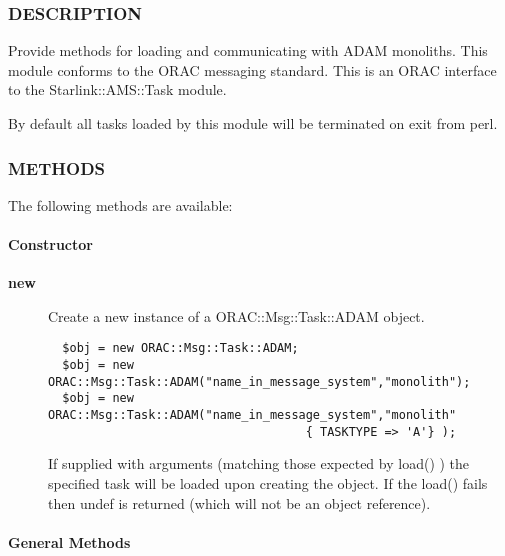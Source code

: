 \begin{description}
\begin{description}
\subsubsection*{DESCRIPTION\label{ORAC::Msg::Task::ADAM_DESCRIPTION}}


Provide methods for loading and communicating with ADAM monoliths.
This module conforms to the ORAC messaging standard. This is an
ORAC interface to the Starlink::AMS::Task module.



By default all tasks loaded by this module will be terminated
on exit from perl.

\subsubsection*{METHODS\label{ORAC::Msg::Task::ADAM_METHODS}}


The following methods are available:

\paragraph*{Constructor\label{ORAC::Msg::Task::ADAM_Constructor}}
\begin{description}

\item[{\textbf{new}}] \mbox{}

Create a new instance of a ORAC::Msg::Task::ADAM object.

\begin{verbatim}
  $obj = new ORAC::Msg::Task::ADAM;
  $obj = new ORAC::Msg::Task::ADAM("name_in_message_system","monolith");
  $obj = new ORAC::Msg::Task::ADAM("name_in_message_system","monolith"
                                    { TASKTYPE => 'A'} );
\end{verbatim}


If supplied with arguments (matching those expected by load() ) the
specified task will be loaded upon creating the object. If the load()
fails then undef is returned (which will not be an object reference).

\end{description}
\paragraph*{General Methods\label{ORAC::Msg::Task::ADAM_General_Methods}}
\begin{description}


\end{description}
\end{description}
\end{description}
